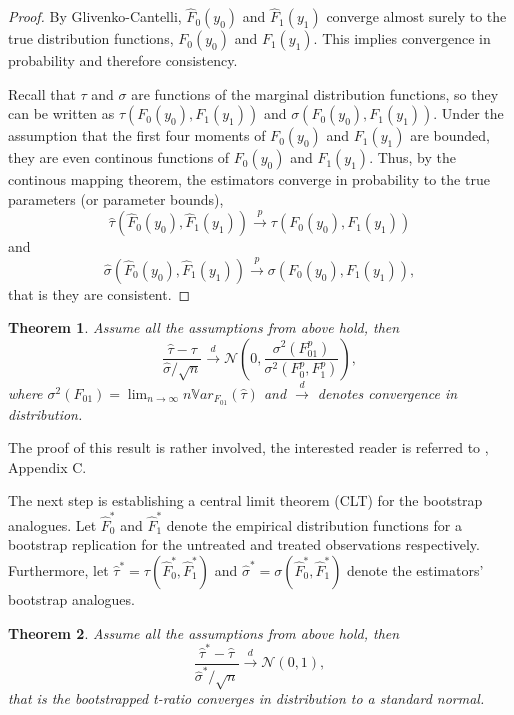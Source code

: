 \documentclass[aodsor,preprint]{imsart}
\numberwithin{equation}{section}
\theoremstyle{plain}
\newtheorem{thm}{Theorem}[section]
\newcommand{\Var}{{\mathbb{V}ar}}
\begin{document}
\begin{proof}
	By Glivenko-Cantelli, $\widehat{F}_0(y_0)$ and $\widehat{F}_1(y_1)$ converge almost surely to the true distribution functions, $F_0(y_0)$ and $F_1(y_1)$. This implies convergence in probability and therefore consistency.
	
	Recall that $\tau$ and $\sigma$ are functions of the marginal distribution functions, so they can be written as $\tau(F_0(y_0), F_1(y_1))$ and $\sigma(F_0(y_0), F_1(y_1))$. Under the assumption that the first four moments of $F_0(y_0)$ and $F_1(y_1)$ are bounded, they are  even continous functions of $F_0(y_0)$ and $F_1(y_1)$. Thus, by the continous mapping theorem, the estimators converge in probability to the true parameters (or parameter bounds),
	$$
	\widehat{\tau}(\widehat{F}_0(y_0), \widehat{F}_1(y_1)) \overset{p}{\to} \tau(F_0(y_0), F_1(y_1))
	$$
	and
	$$
	\widehat{\sigma}(\widehat{F}_0(y_0), \widehat{F}_1(y_1)) \overset{p}{\to} \sigma(F_0(y_0), F_1(y_1)),
	$$
	that is they are consistent.
\end{proof}

\begin{thm}
	Assume all the assumptions from above hold, then 
	$$
	\frac{\widehat{\tau} - \tau}{\widehat{\sigma} / \sqrt{n}} \overset{d}{\to} \mathcal{N} \left( 0, \frac{\sigma^2(F_{01}^p)}{\sigma^2(F_0^p, F_1^p)}\right),
	$$
	where $\sigma^2(F_{01}) = \lim_{n \to \infty} n \Var_{F_{01}} (\widehat{\tau})$ and $\overset{d}{\to}$ denotes convergence in distribution.
\end{thm}

The proof of this result is rather involved, the interested reader is referred to \cite{Imbens_2021}, Appendix C.


The next step is establishing a central limit theorem (CLT) for the bootstrap analogues. Let $\widehat{F}_0^*$ and $\widehat{F}_1^*$ denote the empirical distribution functions for a bootstrap replication for the untreated and treated observations respectively. Furthermore, let $\widehat{\tau}^* = \tau(\widehat{F}_0^*, \widehat{F}_1^*)$ and $\widehat{\sigma}^* = \sigma(\widehat{F}_0^*, \widehat{F}_1^*)$ denote the estimators' bootstrap analogues.
		
\begin{thm} \label{Thm3.2}
	Assume all the assumptions from above hold, then
	$$
	\frac{\widehat{\tau}^* - \widehat{\tau}}{\widehat{\sigma}^* / \sqrt{n}} \overset{d}{\to} \mathcal{N} \left( 0, 1 \right),
	$$
	that is the bootstrapped t-ratio converges in distribution to a standard normal.
\end{thm}
\end{document}

